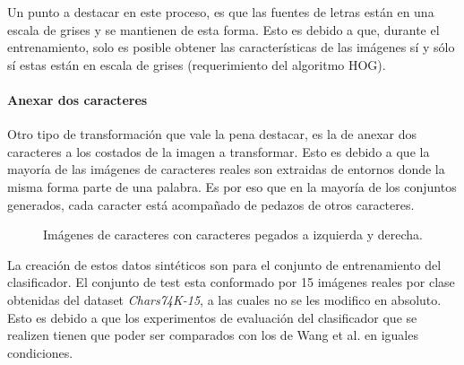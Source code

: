 			Un punto a destacar en este proceso, es que las fuentes de letras están en una escala de grises y se mantienen de esta forma. Esto es debido a que, durante el entrenamiento, solo es posible obtener las características de las imágenes sí y sólo sí estas están en escala de grises (requerimiento del algoritmo HOG). 
			
		\paragraph{Anexar dos caracteres}
					
			Otro tipo de transformación que vale la pena destacar, es la de anexar dos caracteres a los costados de la imagen a transformar. Esto es debido a que la mayoría de las imágenes de caracteres reales son extraidas de entornos donde la misma forma parte de una palabra. Es por eso que en la mayoría de los conjuntos generados, cada caracter está acompañado de pedazos de otros caracteres.
			
		\begin{figure}[htbp]
			\centering
			\caption[Caracteres pegados]{Imágenes de caracteres con caracteres pegados a izquierda y derecha.}
			\label{fig: Imagen anexos}
		\end{figure}

			La creación de estos datos sintéticos son para el conjunto de entrenamiento del clasificador. El conjunto de test esta conformado por 15 imágenes reales por clase obtenidas del dataset \textit{Chars74K-15}, a las cuales no se les modifico en absoluto. Esto es debido a que los experimentos de evaluación del clasificador que se realizen tienen que poder ser comparados con los de Wang et al. en iguales condiciones.


